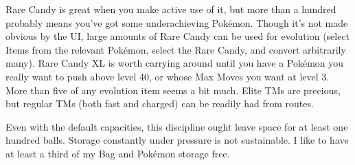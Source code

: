Rare Candy is great when you make active use of it, but more than a hundred
  probably means you've got some underachieving Pokémon.
Though it's not made obvious by the UI, large amounts of Rare Candy can be
  used for evolution (select Items from the relevant Pokémon, select
  the Rare Candy, and convert arbitrarily many).
Rare Candy XL is worth carrying around until you have a Pokémon you really
  want to push above level 40, or whose Max Moves you want at level 3.
More than five of any evolution item seems a bit much.
Elite TMs are precious, but regular TMs (both fast and charged) can be readily
  had from routes.

Even with the default capacities, this discipline ought leave space for at least one hundred balls.
Storage constantly under pressure is not sustainable.
I like to have at least a third of my Bag and Pokémon storage free.

